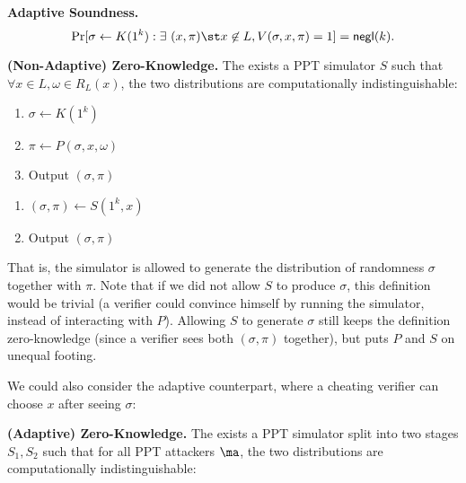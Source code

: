 \medskip
\noindent\textbf{Adaptive Soundness.}
    $$\Pr[\sigma \gets K(1^k): \exists~ (x, \pi) \st  x \not\in L, V(\sigma, x, \pi)
    = 1] = \mathsf{negl}(k).$$
    
\medskip
\noindent\textbf{(Non-Adaptive) Zero-Knowledge.}
    The exists a PPT simulator $S$ such that $\forall x \in L, \omega \in
    R_L(x)$, the two distributions are computationally indistinguishable:

\begin{minipage}{0.5\textwidth}
    \begin{enumerate}[itemsep=-3pt]
        \item $\sigma \gets K(1^k)$
        \item $\pi \gets P(\sigma, x, \omega)$
        \item Output $(\sigma, \pi)$
    \end{enumerate}
\end{minipage}
\begin{minipage}{0.5\textwidth}
    \begin{enumerate}
        \item $(\sigma, \pi) \gets S(1^k, x)$
        \item Output $(\sigma, \pi)$
    \end{enumerate}
\end{minipage}

\medskip
That is, the simulator is allowed to generate the distribution of randomness
$\sigma$ together with $\pi$. Note that if we did not allow $S$ to produce
$\sigma$, this definition would be trivial (a verifier could convince himself by
running the simulator, instead of interacting with $P$). Allowing $S$ to
generate $\sigma$ still keeps the definition zero-knowledge (since a verifier sees both $(\sigma,
\pi)$ together), but puts $P$ and $S$ on unequal footing.

We could also consider the adaptive counterpart, where a cheating verifier can
choose $x$ after seeing $\sigma$:

\medskip
\noindent\textbf{(Adaptive) Zero-Knowledge.}
    The exists a PPT simulator split into two stages $S_1, S_2$ such that
    for all PPT attackers $\ma$,
    the two distributions are computationally indistinguishable:

